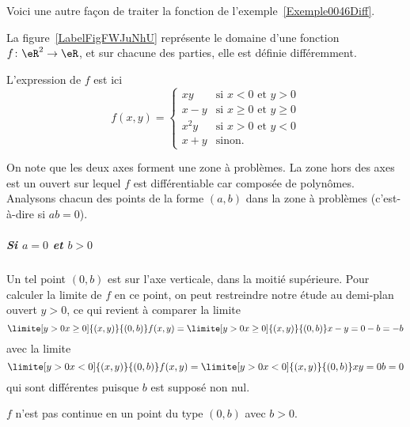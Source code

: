 Voici une autre façon de traiter la fonction de l'exemple~\ref{Exemple0046Diff}.

\begin{example} \label{ExeFHmCLII}
    La figure~\ref{LabelFigFWJuNhU} représente le domaine d'une fonction $f\colon \eR^2\to \eR$, et sur chacune des parties, elle est définie différemment.
    \newcommand{\CaptionFigFWJuNhU}{La fonction de l'exemple~\ref{ExeFHmCLII}.}


L'expression de $f$ est ici
\begin{equation}
  f(x,y) =
  \begin{cases}
      xy & \text{si } x < 0 \text{ et } y > 0\\
      x-y & \text{si } x \geq 0 \text{ et } y \geq 0\\
      x^2y & \text{si } x > 0 \text{ et } y < 0\\
    x+y & \text{sinon.}
  \end{cases}
\end{equation}

On note que les deux axes forment une zone à problèmes. La zone hors
des axes est un ouvert sur lequel $f$ est différentiable car composée
de polynômes. Analysons chacun des points de la forme $(a,b)$ dans la
zone à problèmes (c'est-à-dire si $ab = 0$).

\subparagraph{Si $a = 0$ et $b > 0$} Un tel point $(0,b)$ est sur
l'axe verticale, dans la moitié supérieure. Pour calculer la limite de
$f$ en ce point, on peut restreindre notre étude au demi-plan ouvert
$y > 0$, ce qui revient à comparer la limite
\begin{equation*}
  \limite[y>0\\x\geq 0] {(x,y)} {(0,b)} f(x,y) =   \limite[y>0\\x\geq
  0] {(x,y)} {(0,b)} x-y = 0 - b = -b
\end{equation*}
avec la limite
\begin{equation*}
  \limite[y>0\\x<0] {(x,y)} {(0,b)} f(x,y) =   \limite[y>0\\x<0]
  {(x,y)} {(0,b)} xy = 0 b = 0
\end{equation*}
qui sont différentes puisque $b$ est supposé non nul.

\conclusion $f$ n'est pas continue en un point du type $(0,b)$ avec $b
> 0$.


\end{example}
